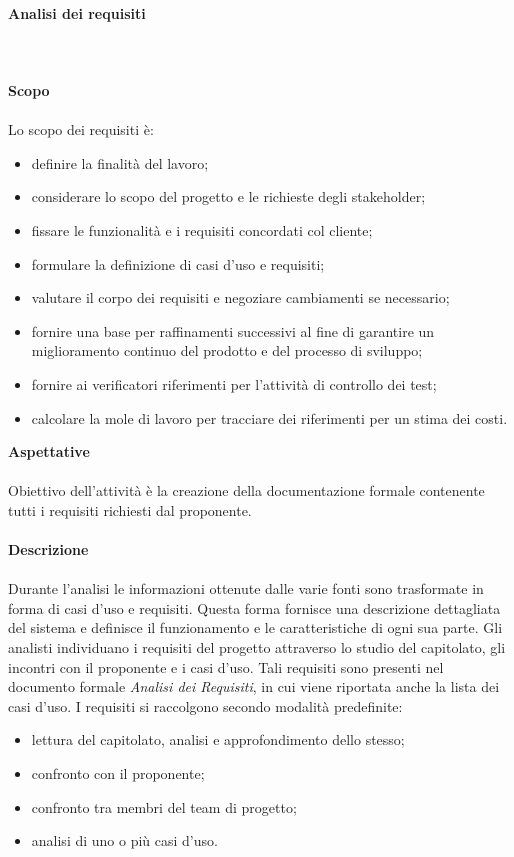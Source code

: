 		\paragraph{Analisi dei requisiti}
		\mbox{}\\ \mbox{}\\
			\textbf{Scopo}  \mbox{}\\ \mbox{}\\
			Lo scopo dei requisiti è:
				\begin{itemize}
					\item definire la finalità del lavoro;
					\item considerare lo scopo del progetto e le richieste degli stakeholder;
					\item fissare le funzionalità e i requisiti concordati col cliente;
					\item formulare la definizione di casi d'uso e requisiti;
					\item valutare il corpo dei requisiti e negoziare cambiamenti se necessario;
					\item fornire  una  base  per  raffinamenti  successivi  al  fine  di garantire  un miglioramento continuo del prodotto e del processo di sviluppo;
					\item fornire ai verificatori riferimenti per l'attività di controllo dei test;
					\item calcolare la mole di lavoro per tracciare dei riferimenti per un stima dei costi.
				\end{itemize}
			\textbf{Aspettative} \mbox{}\\ \mbox{}\\
			\noindent Obiettivo dell'attività è la creazione della documentazione formale contenente tutti i requisiti richiesti dal proponente. \\ \\		
			\textbf{Descrizione} \mbox{}\\ \mbox{}\\
			Durante l'analisi le informazioni ottenute dalle varie fonti sono trasformate in forma di casi d'uso e requisiti. Questa forma fornisce una descrizione dettagliata del sistema e definisce il funzionamento e le caratteristiche di ogni sua parte.\newline
			Gli analisti individuano i requisiti del progetto attraverso lo studio del capitolato, gli incontri con il proponente e i casi d'uso. Tali requisiti sono 	presenti nel documento formale \textit{Analisi dei Requisiti}, in cui viene riportata 	anche la lista dei casi d'uso. \newline
			\noindent I requisiti si raccolgono secondo modalità predefinite:
			\begin{itemize}
				\item lettura del capitolato\glo, analisi e approfondimento dello stesso;
				\item confronto con il proponente;
				\item confronto tra membri del team di progetto;
				\item analisi di uno o più casi d'uso.  \\
			\end{itemize}
			
